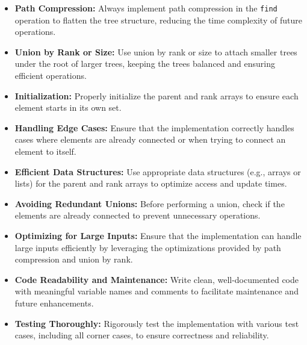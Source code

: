 \begin{itemize}
    \item \textbf{Path Compression:}  
    Always implement path compression in the \texttt{find} operation to flatten the tree structure, reducing the time complexity of future operations.
    
    \item \textbf{Union by Rank or Size:}  
    Use union by rank or size to attach smaller trees under the root of larger trees, keeping the trees balanced and ensuring efficient operations.
    
    \item \textbf{Initialization:} 
    Properly initialize the parent and rank arrays to ensure each element starts in its own set.
    
    \item \textbf{Handling Edge Cases:}  
    Ensure that the implementation correctly handles cases where elements are already connected or when trying to connect an element to itself.
    
    \item \textbf{Efficient Data Structures:} 
    Use appropriate data structures (e.g., arrays or lists) for the parent and rank arrays to optimize access and update times.
    
    \item \textbf{Avoiding Redundant Unions:} 
    Before performing a union, check if the elements are already connected to prevent unnecessary operations.
    
    \item \textbf{Optimizing for Large Inputs:} 
    Ensure that the implementation can handle large inputs efficiently by leveraging the optimizations provided by path compression and union by rank.
    
    \item \textbf{Code Readability and Maintenance:} 
    Write clean, well-documented code with meaningful variable names and comments to facilitate maintenance and future enhancements.
    
    \item \textbf{Testing Thoroughly:} 
    Rigorously test the implementation with various test cases, including all corner cases, to ensure correctness and reliability.
\end{itemize}

